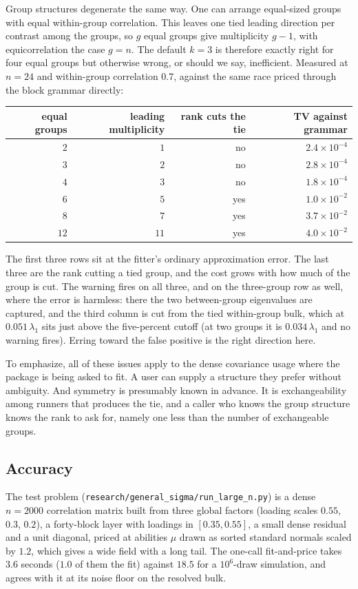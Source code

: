 \documentclass[11pt]{article}
\begin{document}
Group structures degenerate the same way. One can arrange equal-sized groups with equal within-group correlation. This leaves one tied leading direction per contrast among the groups, so $g$ equal
groups give multiplicity $g-1$, with equicorrelation the case $g=n$. The
default $k=3$ is therefore exactly right for four equal groups but otherwise wrong, or should we say, inefficient. Measured at $n=24$ and within-group correlation
$0.7$, against the same race priced through the block grammar directly:

\begin{center}\small
\begin{tabular}{rrrr}
\toprule
equal groups & leading multiplicity & rank cuts the tie & TV against grammar\\
\midrule
$2$ & $1$ & no & $2.4\times10^{-4}$\\
$3$ & $2$ & no & $2.8\times10^{-4}$\\
$4$ & $3$ & no & $1.8\times10^{-4}$\\
$6$ & $5$ & yes & $1.0\times10^{-2}$\\
$8$ & $7$ & yes & $3.7\times10^{-2}$\\
$12$ & $11$ & yes & $4.0\times10^{-2}$\\
\bottomrule
\end{tabular}
\end{center}

The first three rows sit at the fitter's ordinary approximation error.
The last three are the rank cutting a tied group, and the cost grows with
how much of the group is cut. The warning fires on all three, and on the
three-group row as well, where the error is harmless: there the two
between-group eigenvalues are captured, and the third column is cut from
the tied within-group bulk, which at $0.051\,\lambda_1$ sits just above
the five-percent cutoff (at two groups it is $0.034\,\lambda_1$ and no
warning fires).
Erring toward the false positive is the right direction here.

To emphasize, all of these issues apply to the dense covariance usage where the package is being asked to fit. A
user can supply a structure they prefer without ambiguity. And symmetry is
presumably known in advance. It is exchangeability among runners that produces the tie, and a
caller who knows the group structure knows the rank to ask for, namely
one less than the number of exchangeable groups.

\subsection{Accuracy}
The test problem (\texttt{research/general\_sigma/run\_large\_n.py}) is a
dense $n=2000$ correlation matrix built from three global factors
(loading scales $0.55$, $0.3$, $0.2$), a forty-block layer with loadings
in $[0.35,0.55]$, a small dense residual and a unit diagonal, priced at
abilities $\mu$ drawn as sorted standard normals scaled by $1.2$, which
gives a wide field with a long tail. The one-call fit-and-price takes $3.6$
seconds ($1.0$ of them the fit) against $18.5$ for a $10^6$-draw
simulation, and agrees with it at its noise floor on the resolved bulk.
\end{document}
